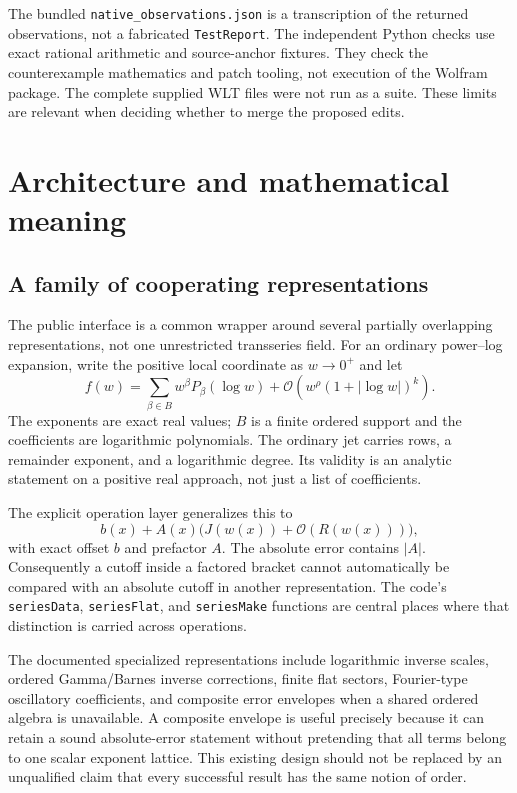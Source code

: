 \documentclass[11pt,letterpaper]{article}
\newcommand{\code}[1]{\nolinkurl{#1}}
\newcommand{\OO}{\mathcal{O}}
\begin{document}
The bundled \code{native_observations.json} is a transcription of the returned
observations, not a fabricated \code{TestReport}. The independent Python checks
use exact rational arithmetic and source-anchor fixtures. They check the
counterexample mathematics and patch tooling, not execution of the Wolfram
package. The complete supplied WLT files were not run as a suite. These limits
are relevant when deciding whether to merge the proposed edits.

\section{Architecture and mathematical meaning}
\subsection{A family of cooperating representations}
The public interface is a common wrapper around several partially overlapping
representations, not one unrestricted transseries field. For an ordinary
power--log expansion, write the positive local coordinate as $w\to0^+$ and let
\begin{equation}\label{eq:ordinary}
 f(w)=\sum_{\beta\in B}w^\beta P_\beta(\log w)
 +\OO\!\left(w^\rho(1+|\log w|)^k\right).
\end{equation}
The exponents are exact real values; $B$ is a finite ordered support and the
coefficients are logarithmic polynomials. The ordinary jet carries rows, a
remainder exponent, and a logarithmic degree. Its validity is an analytic
statement on a positive real approach, not just a list of coefficients.
\cite{main,operations}

The explicit operation layer generalizes this to
\begin{equation}\label{eq:factored}
 b(x)+A(x)\bigl(J(w(x))+\OO(R(w(x)))\bigr),
\end{equation}
with exact offset $b$ and prefactor $A$. The absolute error contains $|A|$.
Consequently a cutoff inside a factored bracket cannot automatically be compared
with an absolute cutoff in another representation. The code's
\code{seriesData}, \code{seriesFlat}, and \code{seriesMake} functions are central
places where that distinction is carried across operations.~\cite{operations}

The documented specialized representations include logarithmic inverse scales,
ordered Gamma/Barnes inverse corrections, finite flat sectors, Fourier-type
oscillatory coefficients, and composite error envelopes when a shared ordered
algebra is unavailable. A composite envelope is useful precisely because it
can retain a sound absolute-error statement without pretending that all terms
belong to one scalar exponent lattice. This existing design should not be
replaced by an unqualified claim that every successful result has the same
notion of order.~\cite{readme,kernelmap,arithmetic}
\end{document}
